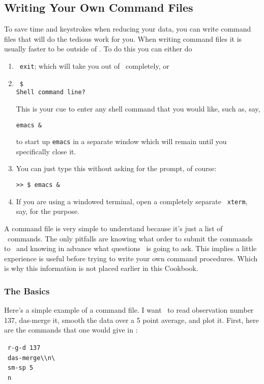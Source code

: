 \subsection{Writing Your Own Command Files}
\label{sec:specx_9}
To save time and keystrokes when reducing your data, you can write
command files that will do the tedious work for you.  When writing
command files it is usually faster to be outside of \SPECX . To do
this you can either do
\begin{enumerate}
\item
\SP\ \verb|exit|; which will take you out of \SPECX\ completely, or
\item
\SP\ \verb|$|\\
\verb|Shell command line?|

This is your cue to enter any shell command that you would like, such
as, say,

\verb|emacs &|

to start up {\tt emacs} in a separate window which will remain until
you specifically close it. 
\item 
You can just type this without asking for the prompt, of course:

\verb|>> $ emacs &|

\item
If you are using a windowed terminal, open a completely separate {\tt
xterm}, say, for the purpose.
\end{enumerate}

A command file is very simple to understand because it's just a list of 
\SPECX\ commands.  The only pitfalls are knowing what order to submit the 
commands to \SPECX\ and knowing in advance what questions \SPECX\ is
going to ask. This implies a little experience is useful before trying
to write your own command procedures. Which is why this information is
not placed earlier in this Cookbook.

\subsubsection{The Basics}
\label{sec:specx_9.1}
Here's a simple example of a command file.  I want \SPECX\ to read
observation number 137, das-merge it, smooth the data over a 5 point
average, and plot it.  First, here are the commands that one would
give in \SPECX :

\SP\ \verb|r-g-d 137| \\
\SP\ \verb|das-merge\\n\ | \\
\SP\ \verb|sm-sp 5| \\
\SP\ \verb|n|

